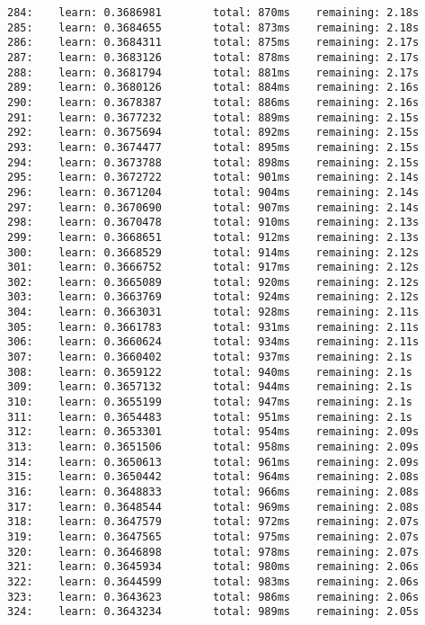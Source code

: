 \documentclass[11pt]{article}
\begin{document}
\begin{Verbatim}[commandchars=\\\{\}]
284:    learn: 0.3686981        total: 870ms    remaining: 2.18s
285:    learn: 0.3684655        total: 873ms    remaining: 2.18s
286:    learn: 0.3684311        total: 875ms    remaining: 2.17s
287:    learn: 0.3683126        total: 878ms    remaining: 2.17s
288:    learn: 0.3681794        total: 881ms    remaining: 2.17s
289:    learn: 0.3680126        total: 884ms    remaining: 2.16s
290:    learn: 0.3678387        total: 886ms    remaining: 2.16s
291:    learn: 0.3677232        total: 889ms    remaining: 2.15s
292:    learn: 0.3675694        total: 892ms    remaining: 2.15s
293:    learn: 0.3674477        total: 895ms    remaining: 2.15s
294:    learn: 0.3673788        total: 898ms    remaining: 2.15s
295:    learn: 0.3672722        total: 901ms    remaining: 2.14s
296:    learn: 0.3671204        total: 904ms    remaining: 2.14s
297:    learn: 0.3670690        total: 907ms    remaining: 2.14s
298:    learn: 0.3670478        total: 910ms    remaining: 2.13s
299:    learn: 0.3668651        total: 912ms    remaining: 2.13s
300:    learn: 0.3668529        total: 914ms    remaining: 2.12s
301:    learn: 0.3666752        total: 917ms    remaining: 2.12s
302:    learn: 0.3665089        total: 920ms    remaining: 2.12s
303:    learn: 0.3663769        total: 924ms    remaining: 2.12s
304:    learn: 0.3663031        total: 928ms    remaining: 2.11s
305:    learn: 0.3661783        total: 931ms    remaining: 2.11s
306:    learn: 0.3660624        total: 934ms    remaining: 2.11s
307:    learn: 0.3660402        total: 937ms    remaining: 2.1s
308:    learn: 0.3659122        total: 940ms    remaining: 2.1s
309:    learn: 0.3657132        total: 944ms    remaining: 2.1s
310:    learn: 0.3655199        total: 947ms    remaining: 2.1s
311:    learn: 0.3654483        total: 951ms    remaining: 2.1s
312:    learn: 0.3653301        total: 954ms    remaining: 2.09s
313:    learn: 0.3651506        total: 958ms    remaining: 2.09s
314:    learn: 0.3650613        total: 961ms    remaining: 2.09s
315:    learn: 0.3650442        total: 964ms    remaining: 2.08s
316:    learn: 0.3648833        total: 966ms    remaining: 2.08s
317:    learn: 0.3648544        total: 969ms    remaining: 2.08s
318:    learn: 0.3647579        total: 972ms    remaining: 2.07s
319:    learn: 0.3647565        total: 975ms    remaining: 2.07s
320:    learn: 0.3646898        total: 978ms    remaining: 2.07s
321:    learn: 0.3645934        total: 980ms    remaining: 2.06s
322:    learn: 0.3644599        total: 983ms    remaining: 2.06s
323:    learn: 0.3643623        total: 986ms    remaining: 2.06s
324:    learn: 0.3643234        total: 989ms    remaining: 2.05s

\end{Verbatim}
\end{document}
